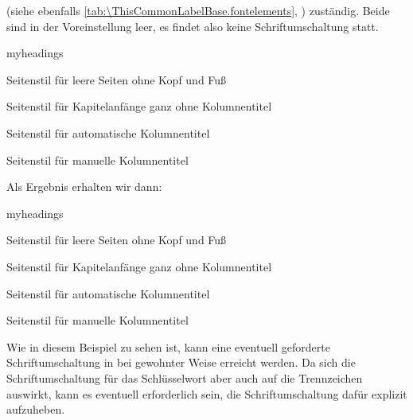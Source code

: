  (siehe
ebenfalls \autoref{tab:\ThisCommonLabelBase.fontelements},
) zuständig. Beide sind in
der Voreinstellung leer, es findet also keine
Schriftumschaltung statt.%
\IfThisCommonFirstRun{\iftrue}{\csname iffalse\endcsname}
  \begin{Example}
\begin{lstcode}
  \begin{labeling}[~--]{myheadings}
    \item[empty] 
      Seitenstil für leere Seiten ohne Kopf und Fuß
    \item[plain] 
      Seitenstil für Kapitelanfänge ganz ohne 
      Kolumnentitel
    \item[headings] 
      Seitenstil für automatische Kolumnentitel
    \item[myheadings]
      Seitenstil für manuelle Kolumnentitel
  \end{labeling}
\end{lstcode}
    Als Ergebnis erhalten wir dann:
    \begin{ShowOutput}
      \begin{labeling}[~--]{myheadings}
      \item[empty] 
        Seitenstil für leere Seiten ohne Kopf und Fuß
      \item[plain] 
        Seitenstil für Kapitelanfänge ganz ohne 
        Kolumnentitel
      \item[headings] 
        Seitenstil für automatische Kolumnentitel
      \item[myheadings]
        Seitenstil für manuelle Kolumnentitel
      \end{labeling}
    \end{ShowOutput}
    Wie in diesem Beispiel zu sehen ist, kann eine eventuell geforderte
    Schriftumschaltung in bei \KOMAScript{} gewohnter Weise erreicht
    werden. Da sich die Schriftumschaltung für das Schlüsselwort aber auch auf
    die Trennzeichen auswirkt, kann es eventuell erforderlich sein, die
    Schriftumschaltung dafür explizit aufzuheben.
  \end{Example}
\fi%
\EndIndexGroup%
%
\EndIndexGroup


